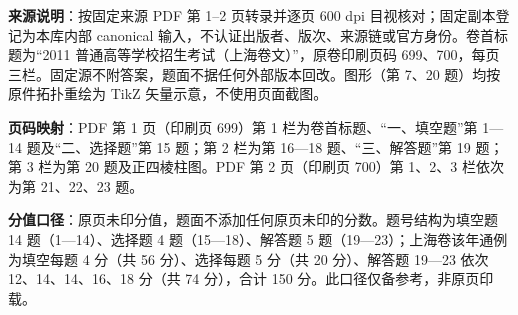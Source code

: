 

\begin{gktip}
\textbf{来源说明}：按固定来源 PDF 第 1–2 页转录并逐页 600 dpi 目视核对；固定副本登记为本库内部 canonical 输入，不认证出版者、版次、来源链或官方身份。卷首标题为“2011 普通高等学校招生考试（上海卷文）”，原卷印刷页码 699、700，每页三栏。固定源不附答案，题面不据任何外部版本回改。图形（第 7、20 题）均按原件拓扑重绘为 TikZ 矢量示意，不使用页面截图。

\textbf{页码映射}：PDF 第 1 页（印刷页 699）第 1 栏为卷首标题、“一、填空题”第 1—14 题及“二、选择题”第 15 题；第 2 栏为第 16—18 题、“三、解答题”第 19 题；第 3 栏为第 20 题及正四棱柱图。PDF 第 2 页（印刷页 700）第 1、2、3 栏依次为第 21、22、23 题。

\textbf{分值口径}：原页未印分值，题面不添加任何原页未印的分数。题号结构为填空题 14 题（1—14）、选择题 4 题（15—18）、解答题 5 题（19—23）；上海卷该年通例为填空每题 4 分（共 56 分）、选择每题 5 分（共 20 分）、解答题 19—23 依次 12、14、14、16、18 分（共 74 分），合计 150 分。此口径仅备参考，非原页印载。
\end{gktip}


